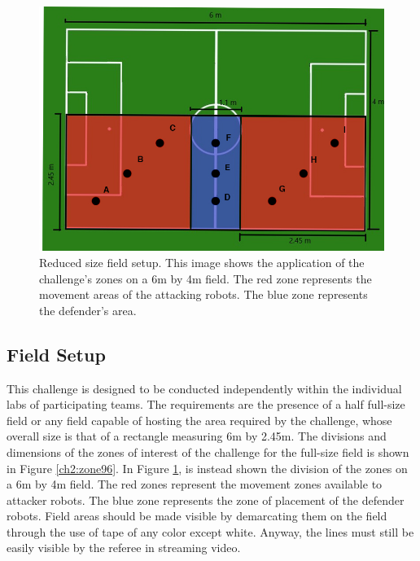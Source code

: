 \begin{figure}[ht]
\includegraphics[width=0.95\linewidth]{figs/ch_2_reduced.jpg}
\caption{Reduced size field setup. This image shows the application of the challenge's zones on a 6m by 4m field. The red zone represents the movement areas of the attacking robots. The blue zone represents the defender's area.}
\label{ch2:zone64}
\centering
\end{figure}


\subsection{Field Setup}
This challenge is designed to be conducted independently within the individual labs of participating teams. The requirements are the presence of a half full-size field or any field capable of hosting the area required by the challenge, whose overall size is that of a rectangle measuring 6m by 2.45m.  
The divisions and dimensions of the zones of interest of the challenge for the full-size field is shown in Figure \ref{ch2:zone96}. In Figure \ref{ch2:zone64}, is instead shown the division of the zones on a 6m by 4m field.
The red zones represent the movement zones available to attacker robots. The blue zone represents the zone of placement of the defender robots.
Field areas should be made visible by demarcating them on the field through the use of tape of any color except white. Anyway, the lines must still be easily visible by the referee in streaming video.



